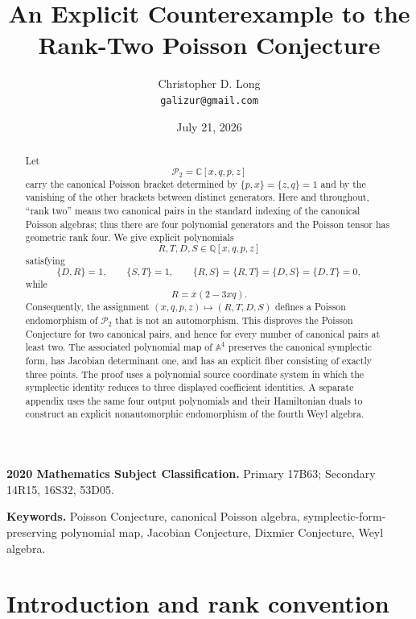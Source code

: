 \documentclass[11pt]{article}
\title{An Explicit Counterexample to the Rank-Two Poisson Conjecture}
\author{Christopher D. Long\\\texttt{galizur@gmail.com}}
\date{July 21, 2026}
\newcommand{\C}{\mathbb C}
\newcommand{\Q}{\mathbb Q}
\newcommand{\Aff}{\mathbb A}
\newcommand{\Pcal}{\mathcal P}
\theoremstyle{remark}
\begin{document}
\maketitle

\begin{abstract}
Let
\[
  \Pcal_2=\C[x,q,p,z]
\]
carry the canonical Poisson bracket determined by
\(
  \{p,x\}=\{z,q\}=1
\)
and by the vanishing of the other brackets between distinct generators.
Here and throughout, ``rank two'' means two canonical pairs in the standard
indexing of the canonical Poisson algebras; thus there are four polynomial
generators and the Poisson tensor has geometric rank four.  We give explicit
polynomials
\[
  R,T,D,S\in\Q[x,q,p,z]
\]
satisfying
\[
  \{D,R\}=1,\qquad \{S,T\}=1,
  \qquad
  \{R,S\}=\{R,T\}=\{D,S\}=\{D,T\}=0,
\]
while
\[
  R=x(2-3xq).
\]
Consequently, the assignment
\(
  (x,q,p,z)\mapsto(R,T,D,S)
\)
defines a Poisson endomorphism of \(\Pcal_2\) that is not an automorphism.
This disproves the Poisson Conjecture for two canonical pairs, and hence for
every number of canonical pairs at least two.  The associated polynomial map
of \(\Aff^4\) preserves the canonical symplectic form, has Jacobian
determinant one, and has an explicit fiber consisting of exactly three points.
The proof uses a polynomial source coordinate system in which the symplectic
identity reduces to three displayed coefficient identities.  A separate
appendix uses the same four output polynomials and their
Hamiltonian duals to construct an explicit nonautomorphic endomorphism of the
fourth Weyl algebra.
\end{abstract}

\medskip
\noindent\textbf{2020 Mathematics Subject Classification.}
Primary 17B63; Secondary 14R15, 16S32, 53D05.

\noindent\textbf{Keywords.}
Poisson Conjecture, canonical Poisson algebra, symplectic-form-preserving
polynomial map, Jacobian Conjecture, Dixmier Conjecture, Weyl algebra.

\section{Introduction and rank convention}\label{sec:introduction}
\end{document}
